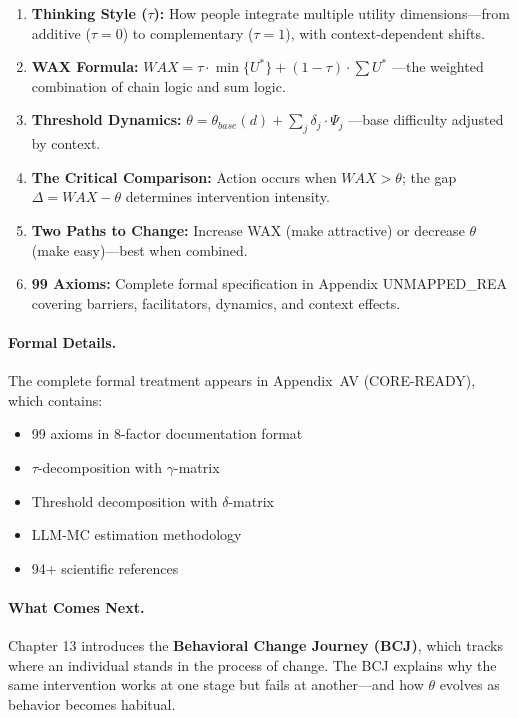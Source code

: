 \begin{enumerate}
    \item \textbf{Thinking Style ($\tau$):} How people integrate multiple utility
          dimensions---from additive ($\tau = 0$) to complementary ($\tau = 1$),
          with context-dependent shifts.

    \item \textbf{WAX Formula:} $WAX = \tau \cdot \min\{U^*\} + (1-\tau) \cdot \sum U^*$
          ---the weighted combination of chain logic and sum logic.

    \item \textbf{Threshold Dynamics:} $\theta = \theta_{base}(d) + \sum_j \delta_j \cdot \Psi_j$
          ---base difficulty adjusted by context.

    \item \textbf{The Critical Comparison:} Action occurs when $WAX > \theta$;
          the gap $\Delta = WAX - \theta$ determines intervention intensity.

    \item \textbf{Two Paths to Change:} Increase WAX (make attractive) or
          decrease $\theta$ (make easy)---best when combined.

    \item \textbf{99 Axioms:} Complete formal specification in Appendix UNMAPPED_REA
          covering barriers, facilitators, dynamics, and context effects.
\end{enumerate}

\paragraph{Formal Details.}
The complete formal treatment appears in Appendix~AV (CORE-READY), which contains:
\begin{itemize}[nosep]
    \item 99 axioms in 8-factor documentation format
    \item $\tau$-decomposition with $\gamma$-matrix
    \item Threshold decomposition with $\delta$-matrix
    \item LLM-MC estimation methodology
    \item 94+ scientific references
\end{itemize}

\paragraph{What Comes Next.}
Chapter 13 introduces the \textbf{Behavioral Change Journey (BCJ)}, which tracks
where an individual stands in the process of change. The BCJ explains why the
same intervention works at one stage but fails at another---and how $\theta$
evolves as behavior becomes habitual.

